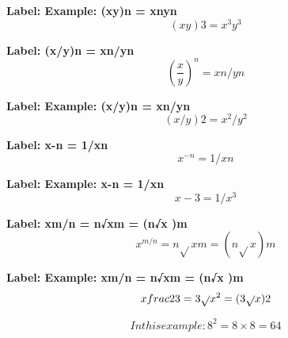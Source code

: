 \textbf{Label: Example: (xy)n = xnyn}
\[(xy)3 = x^{3}y^{3}\]

\textbf{Label: (x/y)n = xn/yn}
\[(\frac{x}{y})^{n} = xn/yn\]

\textbf{Label: Example: (x/y)n = xn/yn}
\[(x/y)2 = x^{2} / y^{2}\]

\textbf{Label: x-n = 1/xn}
\[x^{-n} = 1/xn\]

\textbf{Label: Example: x-n = 1/xn}
\[x-3 = 1/x^{3}\]

\textbf{Label: xm/n = n√xm = (n√x )m}
\[x^{m/n} = n\sqrt{}xm = (n\sqrt{}x )m\]

\textbf{Label: Example: xm/n = n√xm = (n√x )m}
\[x\\frac{2}{3} = 3\sqrt{}x^{2} = (3\sqrt{}x )2\]

\[In this example: 8^{2} = 8 \times 8 = 64\]

